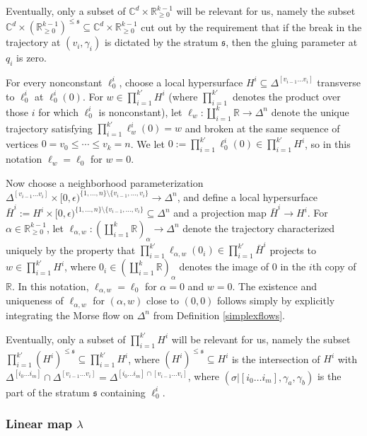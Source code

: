 \documentclass[12pt]{article}
\theoremstyle{definition}
\theoremstyle{remark}
\numberwithin{equation}{subsection}
\newcommand{\s}{\mathfrak s}
\newcommand{\CC}{\mathbb C}
\newcommand{\RR}{\mathbb R}
\begin{document}
Eventually, only a subset of $\CC^d\times\RR_{\geq 0}^{k-1}$ will be relevant for us, namely the subset $\CC^d\times(\RR_{\geq 0}^{k-1})^{\leq\s}\subseteq\CC^d\times\RR_{\geq 0}^{k-1}$ cut out by the requirement that if the break in the trajectory at $(v_i,\gamma_i)$ is dictated by the stratum $\s$, then the gluing parameter at $q_i$ is zero.

For every nonconstant $\ell_0^i$, choose a local hypersurface $H^i\subseteq\Delta^{[v_{i-1}\ldots v_i]}$ transverse to $\ell_0^i$ at $\ell_0^i(0)$.  For $w\in\prod_{i=1}^{k\prime}H^i$ (where $\prod_{i=1}^{k\prime}$ denotes the product over those $i$ for which $\ell_0^i$ is nonconstant), let $\ell_w:\coprod_{i=1}^k\RR\to\Delta^n$ denote the unique trajectory satisfying $\prod_{i=1}^{k\prime}\ell_w^i(0)=w$ and broken at the same sequence of vertices $0=v_0\leq\cdots\leq v_k=n$.  We let $0:=\prod_{i=1}^{k\prime}\ell_0^i(0)\in\prod_{i=1}^{k\prime}H^i$, so in this notation $\ell_w=\ell_0$ for $w=0$.

Now choose a neighborhood parameterization $\Delta^{[v_{i-1}\ldots v_i]}\times[0,\epsilon)^{\{1,\ldots,n\}\setminus\{v_{i-1},\ldots,v_i\}}\to\Delta^n$, and define a local hypersurface $\bar H^i:=H^i\times[0,\epsilon)^{\{1,\ldots,n\}\setminus\{v_{i-1},\ldots,v_i\}}\subseteq\Delta^n$ and a projection map $\bar H^i\to H^i$.  For $\alpha\in\RR_{\geq 0}^{k-1}$, let $\ell_{\alpha,w}:(\coprod_{i=1}^k\RR)_\alpha\to\Delta^n$ denote the trajectory characterized uniquely by the property that $\prod_{i=1}^{k\prime}\ell_{\alpha,w}(0_i)\in\prod_{i=1}^{k\prime}\bar H^i$ projects to $w\in\prod_{i=1}^{k\prime}H^i$, where $0_i\in(\coprod_{i=1}^k\RR)_\alpha$ denotes the image of $0$ in the $i$th copy of $\RR$.  In this notation, $\ell_{\alpha,w}=\ell_0$ for $\alpha=0$ and $w=0$.  The existence and uniqueness of $\ell_{\alpha,w}$ for $(\alpha,w)$ close to $(0,0)$ follows simply by explicitly integrating the Morse flow on $\Delta^n$ from Definition \ref{simplexflows}.

Eventually, only a subset of $\prod_{i=1}^{k\prime}H^i$ will be relevant for us, namely the subset $\prod_{i=1}^{k\prime}(H^i)^{\leq\s}\subseteq\prod_{i=1}^{k\prime}H^i$, where $(H^i)^{\leq\s}\subseteq H^i$ is the intersection of $H^i$ with $\Delta^{[i_0\ldots i_m]}\cap\Delta^{[v_{i-1}\ldots v_i]}=\Delta^{[i_0\ldots i_m]\cap[v_{i-1}\ldots v_i]}$, where $(\sigma|[i_0\ldots i_m],\gamma_a,\gamma_b)$ is the part of the stratum $\s$ containing $\ell^i_0$.

\subsubsection{Linear map $\lambda$}
\end{document}
